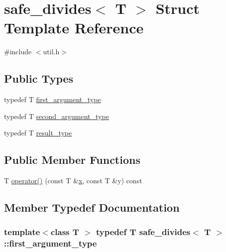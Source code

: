 \hypertarget{structsafe__divides}{}\section{safe\+\_\+divides$<$ T $>$ Struct Template Reference}
\label{structsafe__divides}


{\ttfamily \#include $<$util.\+h$>$}

\subsection*{Public Types}
\begin{DoxyCompactItemize}
\item 
typedef T \hyperlink{structsafe__divides_a9f8892b4cda953aa97ceeccd73130471}{first\+\_\+argument\+\_\+type}
\item 
typedef T \hyperlink{structsafe__divides_a187b4236dcbd0b6b1d4886bf4f48476e}{second\+\_\+argument\+\_\+type}
\item 
typedef T \hyperlink{structsafe__divides_abbb9fce8bafb09573443a683510edfa1}{result\+\_\+type}
\end{DoxyCompactItemize}
\subsection*{Public Member Functions}
\begin{DoxyCompactItemize}
\item 
T \hyperlink{structsafe__divides_a7c0287d6cde5f6edc1964a420b6e3e0b}{operator()} (const T \&\hyperlink{vecnorm1_8cc_ac73eed9e41ec09d58f112f06c2d6cb63}{x}, const T \&y) const 
\end{DoxyCompactItemize}


\subsection{Member Typedef Documentation}
\hypertarget{structsafe__divides_a9f8892b4cda953aa97ceeccd73130471}{}
\subsubsection[{first\+\_\+argument\+\_\+type}]{\setlength{\rightskip}{0pt plus 5cm}template$<$class T $>$ typedef T {\bf safe\+\_\+divides}$<$ T $>$\+::{\bf first\+\_\+argument\+\_\+type}}\label{structsafe__divides_a9f8892b4cda953aa97ceeccd73130471}
\hypertarget{structsafe__divides_abbb9fce8bafb09573443a683510edfa1}{}
